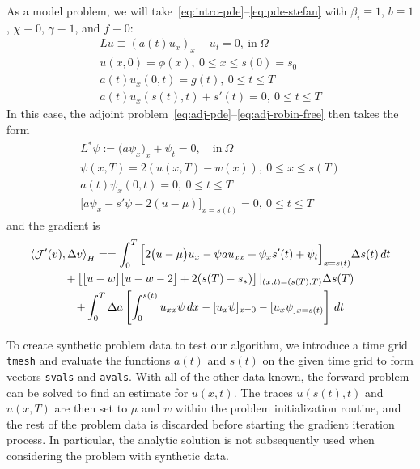 \documentclass[letterpaper, 10pt, draft]{amsart}
\theoremstyle{definition}
\theoremstyle{remark}
\begin{document}
As a model problem, we will take~\eqref{eq:intro-pde}--\eqref{eq:pde-stefan}
with $\beta_i \equiv 1$, $b\equiv 1$, $\chi \equiv 0$, $\gamma \equiv 1$, and
$f\equiv 0$:
\begin{gather}
  Lu \equiv {(a(t) u_x)}_x - u_{t} = 0,~\text{in}~\Omega
  \\
  u(x,0) = \phi (x),~0 \leq x \leq s(0) = s_0
  \\
  a(t) u_x (0,t) = g(t),~0 \leq t \leq T
  \\
  a(t) u_x (s(t),t) + s'(t) = 0,~0 \leq t \leq
  T
\end{gather}
In this case, the adjoint problem~\eqref{eq:adj-pde}--\eqref{eq:adj-robin-free} then takes the form
\begin{gather}
  L^{*} \psi := \big(a \psi_x\big)_x + \psi_t = 0,\quad\text{in}~\Omega
  \\
  \psi(x, T) = 2(u(x, T) - w(x)),~0 \leq x \leq s(T)
  \\
  a(t)\psi_x(0, t) =0,~0 \leq t \leq T
  \\
  \Big[a \psi_x - s'\psi - 2 (u - \mu)\Big]_{x=s(t)}=0, ~0 \leq t \leq T
\end{gather}
and the gradient is
\begin{gather}
  \left\langle \mathcal{J}'(v),\Delta v \right\rangle_H
  = =\int_0^T \Big[
  2\big(u - \mu\big)u_x
  - \psi  a u_{xx}
  + \psi_x s'(t)
  + \psi_t
  \Big]_{x=s(t)} {\Delta s}(t)\,dt \nonumber
  \\
  +
  \left[
    \big[u - w\big]\big[u - w - 2\big] + 2 (s(T) - s_*)
  \right]\vert_{(x,t)=(s(T),T)} {\Delta s}(T)\nonumber
  \\
  + \int_0^T {\Delta a} \left[
    \int_0^{s(t)}  u_{xx} \psi \,dx
    - [u_x \psi]_{x=0}
    - [u_x\psi]_{x=s(t)}
  \right]\,dt\nonumber
\end{gather}

To create synthetic problem data to test our algorithm, we introduce a time grid
\verb+tmesh+ and evaluate the functions $a(t)$ and $s(t)$ on the given time grid
to form vectors \verb+svals+ and \verb+avals+.
With all of the other data known, the forward problem can be solved to find
an estimate for $u(x,t)$.
The traces $u(s(t),t)$ and $u(x,T)$ are then set to $\mu$ and $w$ within the
problem initialization routine, and the rest of the problem data is discarded
before starting the gradient iteration process.
In particular, the analytic solution is not subsequently used when considering
the problem with synthetic data.
\end{document}
